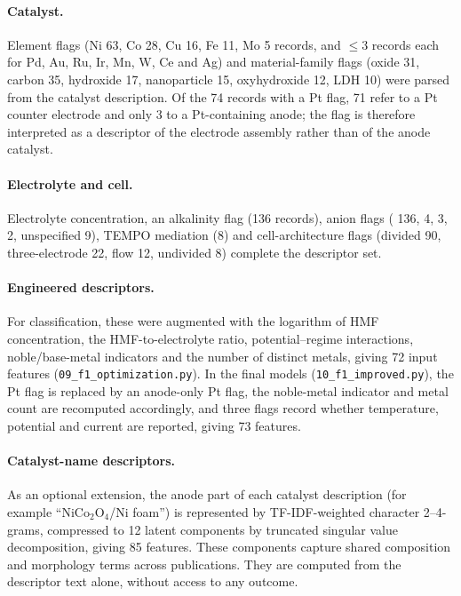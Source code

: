 \documentclass[10pt,a4paper]{article}
\begin{document}
\paragraph{Catalyst.} Element flags (Ni 63, Co 28, Cu 16, Fe 11, Mo 5 records,
and $\leq$3 records each for Pd, Au, Ru, Ir, Mn, W, Ce and Ag) and material-family
flags (oxide 31, carbon 35, hydroxide 17, nanoparticle 15, oxyhydroxide 12,
LDH 10) were parsed from the catalyst description. Of the 74 records with a Pt
flag, 71 refer to a Pt counter electrode and only 3 to a Pt-containing anode;
the flag is therefore interpreted as a descriptor of the electrode assembly
rather than of the anode catalyst.

\paragraph{Electrolyte and cell.} Electrolyte concentration, an alkalinity flag
(136 records), anion flags ( 136,  4,  3,
 2, unspecified 9), TEMPO mediation (8) and cell-architecture flags
(divided 90, three-electrode 22, flow 12, undivided 8) complete the descriptor
set.

\paragraph{Engineered descriptors.} For classification, these were augmented
with the logarithm of HMF concentration, the HMF-to-electrolyte ratio,
potential--regime interactions, noble/base-metal indicators and the number of
distinct metals, giving 72 input features (\texttt{09\_f1\_optimization.py}).
In the final models (\texttt{10\_f1\_improved.py}), the Pt flag is replaced by an
anode-only Pt flag, the noble-metal indicator and metal count are recomputed
accordingly, and three flags record whether temperature, potential and current
are reported, giving 73 features.

\paragraph{Catalyst-name descriptors.} As an optional extension, the anode part
of each catalyst description (for example ``NiCo$_2$O$_4$/Ni foam'') is
represented by TF-IDF-weighted character 2--4-grams, compressed to 12 latent
components by truncated singular value decomposition, giving 85 features. These
components capture shared composition and morphology terms across publications.
They are computed from the descriptor text alone, without access to any
outcome.
\end{document}
